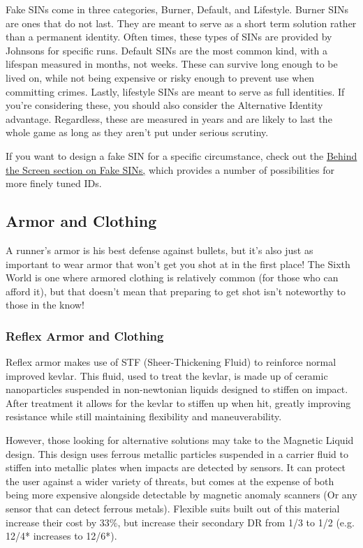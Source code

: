 Fake SINs come in three categories, Burner, Default, and Lifestyle. Burner SINs are ones that do not last. They are meant to serve as a short term solution rather than a permanent identity. Often times, these types of SINs are provided by Johnsons for specific runs. Default SINs are the most common kind, with a lifespan measured in months, not weeks. These can survive long enough to be lived on, while not being expensive or risky enough to prevent use when committing crimes. Lastly, lifestyle SINs are meant to serve as full identities. If you're considering these, you should also consider the Alternative Identity advantage. Regardless, these are measured in years and are likely to last the whole game as long as they aren't put under serious scrutiny.

If you want to design a fake SIN for a specific circumstance, check out the \hyperref[bts_fake_SIN]{Behind the Screen section on Fake SINs,} which provides a number of possibilities for more finely tuned IDs.

\subsection{Armor and Clothing}

A runner's armor is his best defense against bullets, but it's also just as important to wear armor that won't get you shot at in the first place! The Sixth World is one where armored clothing is relatively common (for those who can afford it), but that doesn't mean that preparing to get shot isn't noteworthy to those in the know!

\subsubsection{Reflex Armor and Clothing}

Reflex armor makes use of STF (Sheer-Thickening Fluid) to reinforce normal improved kevlar. This fluid, used to treat the kevlar, is made up of ceramic nanoparticles suspended in non-newtonian liquids designed to stiffen on impact. After treatment it allows for the kevlar to stiffen up when hit, greatly improving resistance while still maintaining flexibility and maneuverability.

However, those looking for alternative solutions may take to the Magnetic Liquid design. This design uses ferrous metallic particles suspended in a carrier fluid to stiffen into metallic plates when impacts are detected by sensors. It can protect the user against a wider variety of threats, but comes at the expense of both being more expensive alongside detectable by magnetic anomaly scanners (Or any sensor that can detect ferrous metals). Flexible suits built out of this material increase their cost by 33\%, but increase their secondary DR from 1/3 to 1/2 (e.g. 12/4* increases to 12/6*).

